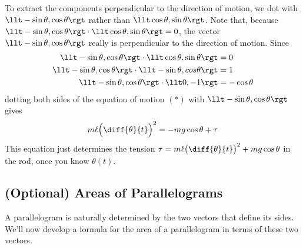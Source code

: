 To extract the components perpendicular to the direction of motion, we
dot with $\llt -\sin\theta,\cos\theta\rgt $ rather than $\llt \cos\theta,\sin\theta\rgt $. Note that,
because $\llt -\sin\theta,\cos\theta\rgt \cdot
   \llt \cos\theta,\sin\theta\rgt =0$, the vector
$\llt -\sin\theta,\cos\theta\rgt $ really is perpendicular to the 
direction of motion.  Since
\begin{align*}
\llt -\sin\theta,\cos\theta\rgt \cdot\llt \cos\theta,\sin\theta\rgt &=0\\
\llt -\sin\theta,\cos\theta\rgt \cdot\llt -\sin\theta,cos\theta\rgt &=1\\
\llt -\sin\theta,\cos\theta\rgt \cdot\llt 0,-1\rgt &=-\cos\theta
\end{align*}
dotting both sides of the equation of motion $(*)$
with $\llt -\sin\theta,\cos\theta\rgt $ gives
\begin{align*}
m\ell\Big(\diff{\theta}{t}\Big)^2=-mg\cos\theta+\tau 
\end{align*}
This equation just determines the tension
$\tau=m\ell\big(\diff{\theta}{t}\big)^2+mg\cos\theta$ in the rod, once you know
$\theta(t)$.

\subsection{(Optional) Areas of Parallelograms}\label{sec:GEOparallelogram}
A parallelogram is naturally determined by the two vectors that 
define its sides. We'll now develop a formula for the area of a
parallelogram in terms of these two vectors. 

